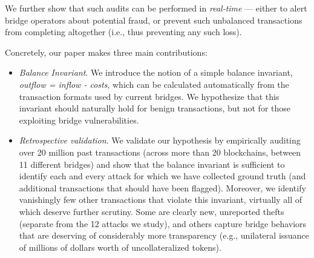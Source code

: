 We further show that such audits can be performed in \emph{real-time}
--- either to alert bridge operators about potential fraud, or prevent
such unbalanced transactions from completing altogether (i.e., thus
preventing any such loss).


Concretely, our paper makes three main contributions:
\begin{itemize}
\item\emph{Balance Invariant}.  We introduce the notion of a simple
  balance invariant, \emph{outflow = inflow - costs}, which can be
  calculated automatically from the transaction formats used by
  current bridges.  We hypothesize that this invariant should naturally hold for benign
  transactions, but not for those exploiting bridge vulnerabilities.

\item\emph{Retrospective validation}.  We validate our hypothesis by
  empirically auditing over 20 million past transactions (across more
  than 20 blockchains, between 11 different bridges) and show that the
  balance invariant is sufficient to identify each and every attack
  for which we have collected ground truth (and additional transactions that should have been flagged).  Moreover, we identify
  vanishingly few other transactions that violate this invariant,
  virtually all of which deserve further scrutiny. Some are clearly new, unreported thefts (separate from the 12 attacks we study), and others capture bridge behaviors that are deserving of considerably more transparency (e.g., unilateral issuance of millions of dollars worth of uncollateralized tokens).
  


\end{itemize}
